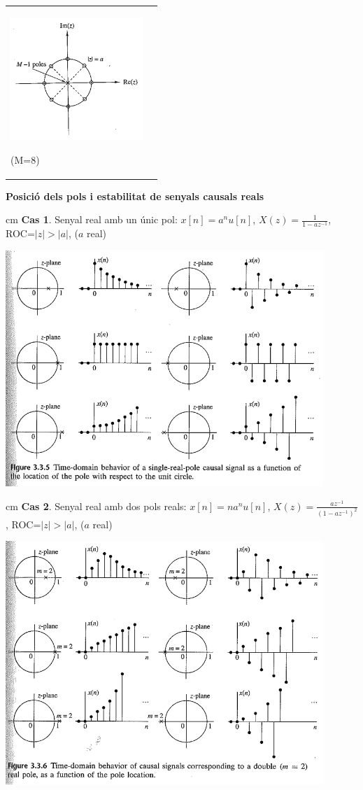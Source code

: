 \documentclass{article}
\begin{document}
\begin{tabular}{l|c}
\begin{minipage}{5cm} 
\includegraphics[width=5cm]{ex2PolsZeros.png}
\end{minipage} (M=8)

\end{tabular}


\newpage
\noindent
\textbf{Posici\'o dels pols i estabilitat de senyals causals reals}

 cm
\noindent
\textbf{Cas 1}. Senyal real amb un \'unic pol: $x[n]=a^nu[n]$, $X(z)=\frac{1}{1-az^{-1}}$, ROC=$|z|>|a|$, ($a$ real)
\begin{center}
\includegraphics[width=12cm]{singlepole.png}
\end{center}

 cm
\noindent
\textbf{Cas 2}. Senyal real amb dos pols reals: $x[n]=n a^nu[n]$, $X(z)=\frac{az^{-1}}{(1-az^{-1})^2}$, ROC=$|z|>|a|$, ($a$ real)
\begin{center}
\includegraphics[width=12cm]{doublerealpole.png}
\end{center}
\end{document}
